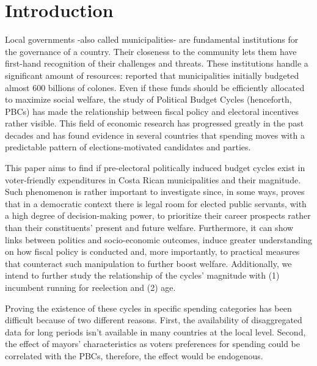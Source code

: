 \newpage
\setcounter{page}{1}

\section{Introduction}

Local governments -also called municipalities- are fundamental institutions for the governance of a country. Their closeness to the community lets them have first-hand recognition of their challenges and threats. These institutions handle a significant amount of resources: \textcite{cgr2020} reported that municipalities initially budgeted almost 600 billions of colones. Even if these funds should be efficiently allocated to maximize social welfare, the study of Political Budget Cycles (henceforth, PBCs) has made the relationship between fiscal policy and electoral incentives rather visible. This field of economic research has progressed greatly in the past decades and has found evidence in several countries that spending moves with a predictable pattern of elections-motivated candidates and parties. \parencite{chortareas2016,drazen2010}

This paper aims to find if pre-electoral politically induced budget cycles exist in voter-friendly expenditures in Costa Rican municipalities and their magnitude. Such phenomenon is rather important to investigate since, in some ways, proves that in a democratic context there is legal room for elected public servants, with a high degree of decision-making power, to prioritize their career prospects rather than their constituents' present and future welfare. Furthermore, it can show links between politics and socio-economic outcomes, induce greater understanding on how fiscal policy is conducted and, more importantly, to practical measures that counteract such manipulation to further boost welfare. Additionally, we intend to further study the relationship of the cycles’ magnitude with (1) incumbent running for reelection and (2) age. \parencite{alesina2018,chortareas2016}

Proving the existence of these cycles in specific spending categories has been difficult because of two different reasons.  First, the availability of disaggregated data for long periods isn’t available in many countries at the local level. Second, the effect of mayors’ characteristics as voters preferences for spending could be correlated with the PBCs, therefore, the effect would be endogenous. 

